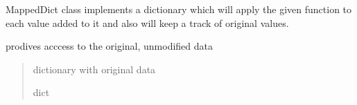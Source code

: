 \documentclass[letterpaper,10pt,english]{sphinxmanual}
\begin{document}
\begin{fulllineitems}
\label{\detokenize{code_documentation:raypyng.collections.MappedDict}}
\pysigstartsignatures
{}
\pysigstopsignatures
\sphinxAtStartPar
MappedDict class implements a dictionary which will apply the given
function to each value added to it and also will keep a track of original
values.

\begin{fulllineitems}
\label{\detokenize{code_documentation:raypyng.collections.MappedDict.original}}
\pysigstartsignatures
{}
\pysigstopsignatures
\sphinxAtStartPar
prodives acccess to the original, unmodified data
\begin{quote}\begin{description}
\sphinxAtStartPar
dictionary with original data

\sphinxAtStartPar
dict

\end{description}\end{quote}

\end{fulllineitems}


\end{fulllineitems}

\end{document}
